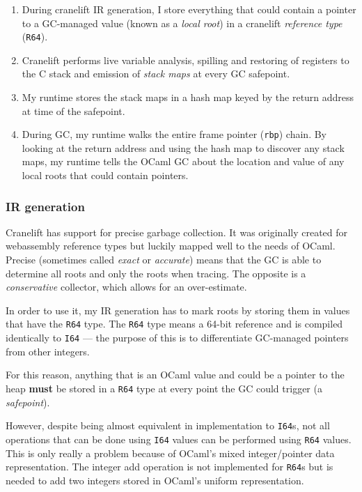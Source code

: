 \begin{enumerate}
      \item During cranelift IR generation, I store everything that could contain a pointer to a
            GC-managed value (known as a \emph{local root}) in a cranelift \emph{reference type}
            (\texttt{R64}).
      \item Cranelift performs live variable analysis, spilling and restoring of registers to the C
            stack and emission of \emph{stack maps} at every GC safepoint.
      \item My runtime stores the stack maps in a hash map keyed by the return address at time of
            the safepoint.
      \item During GC, my runtime walks the entire frame pointer (\texttt{rbp}) chain. By looking
            at the return address and using the hash map to discover any stack maps, my runtime
            tells the OCaml GC about the location and value of any local roots that could contain
            pointers.
\end{enumerate}

\subsubsection{IR generation} \label{gc-ir}

Cranelift has support for precise garbage collection. It was originally created for webassembly
reference types but luckily mapped well to the needs of OCaml. Precise (sometimes called
\emph{exact} or \emph{accurate}) means that the GC is able to determine all roots and only the
roots
when tracing. The opposite is a \emph{conservative} collector, which allows for an over-estimate.

In order to use it, my IR generation has to mark roots by storing them in values that have the
\texttt{R64} type. The \texttt{R64} type means a 64-bit reference and is compiled identically to
\texttt{I64} --- the purpose of this is to differentiate GC-managed pointers from other integers.

For this reason, anything that is an OCaml value and could be a pointer to the heap \textbf{must}
be stored in a \texttt{R64} type at every point the GC could trigger (a \emph{safepoint}).

However, despite being almost equivalent in implementation to \texttt{I64}s, not all operations
that
can be done using \texttt{I64} values can be performed using \texttt{R64} values. This is only
really a
problem because of OCaml's mixed integer/pointer data representation. The integer add operation is
not
implemented for \texttt{R64}s but is needed to add two integers stored in OCaml's uniform
representation.

